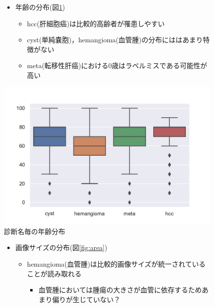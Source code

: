 \documentclass[a4j]{ujarticle}
\newcommand{\Fref}[1]{\mbox{図\ref{fig:#1}}}
\begin{document}
\begin{itemize}
			\begin{figure}[ht]
				\begin{minipage}{.59\textwidth}
					\begin{itemize}
						\item 年齢の分布(\Fref{age})
						\begin{itemize}
							\item hcc(肝細胞癌)は比較的高齢者が罹患しやすい
							\item cyst(単純嚢胞)，hemangioma(血管腫)の分布にははあまり特徴がない
							\item meta(転移性肝癌)における0歳はラベルミスである可能性が高い
						\end{itemize}
					\end{itemize}
				\end{minipage}
				\begin{minipage}{.39\textwidth}
					\centering
					\includegraphics[width=\linewidth]{../fig/age_a.pdf}
					\caption{診断名毎の年齢分布}
					\label{fig:age}
				\end{minipage}
			\end{figure}
			\begin{figure}[ht]
				\begin{minipage}{.59\textwidth}
					\begin{itemize}
						\item 画像サイズの分布(\Fref{area})
						\begin{itemize}
							\item hemangioma(血管腫)は比較的画像サイズが統一されていることが読み取れる
							\begin{itemize}
								\item 血管腫においては腫瘍の大きさが血管に依存するためあまり偏りが生じていない？

\end{itemize}
\end{itemize}
\end{itemize}
\end{minipage}
\end{figure}
\end{itemize}
\end{document}
